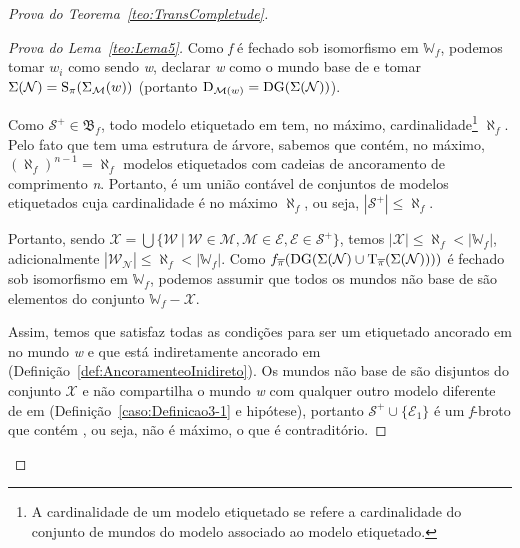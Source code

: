 \begin{apendicesenv}
\begin{proof}[Prova do Teorema~\ref{teo:TransCompletude}]
\begin{proof}[Prova do Lema~\ref{teo:Lema5}]
                Como \textit{f} é fechado sob isomorfismo em \(\mathbb{W}_f\), podemos tomar \(w_i\) como sendo \textit{w}, declarar \textit{w} como o mundo
                base de  e tomar \(\Sigma(\mathcal{N}) = \operatorname{S}_{\pi}(\Sigma_{\mathcal{M}}(w))\)
                (portanto \(\operatorname{D}_{\mathcal{M}(w)} = \operatorname{DG}(\Sigma(\mathcal{N}))\)).

                Como \(\mathcal{S}^{+} \in \mathfrak{B}_{f}\), todo modelo etiquetado em  tem, no máximo, cardinalidade\footnote{A cardinalidade de um modelo etiquetado
                se refere a cardinalidade do conjunto de mundos do modelo associado ao modelo etiquetado.} \(\aleph_{f}\).
                Pelo fato que  tem uma estrutura de árvore, sabemos que  contém, no máximo, \((\aleph_{f})^{n-1} = \aleph_{f}\)
                modelos etiquetados com cadeias de ancoramento de comprimento \textit{n}. Portanto,  é um união contável de conjuntos de modelos etiquetados cuja
                cardinalidade é no máximo \(\aleph_{f}\), ou seja, \(|\mathcal{S}^{+}| \leq \aleph_{f}\).

                Portanto, sendo \(\mathcal{X} = \bigcup \{\mathcal{W} \ | \ \mathcal{W} \in \mathcal{M}, \mathcal{M} \in \mathcal{E}, \mathcal{E} \in \mathcal{S}^{+} \}\), temos
                \(|\mathcal{X}| \leq \aleph_{f} < |\mathbb{W}_{f}|\), adicionalmente \(|\mathcal{W}_{\mathcal{N}}| \leq \aleph_{f} < |\mathbb{W}_{f}|\).
                Como \(f_{\overline{\pi}}(\operatorname{DG}(\Sigma(\mathcal{N}) \cup \operatorname{T}_{\overline{\pi}}(\Sigma(\mathcal{N}))))\) é fechado sob isomorfismo em \(\mathbb{W}_{f}\),
                podemos assumir que todos os mundos não base de  são elementos do conjunto \(\mathbb{W}_{f}-\mathcal{X}\).

                Assim, temos que  satisfaz todas as condições para ser um \OPImodelo etiquetado ancorado em  no mundo \textit{w}
                e que  está indiretamente ancorado em \Modeloinicial (Definição~\ref{def:AncoramenteoInidireto}).
                Os mundos não base de  são disjuntos do conjunto \(\mathcal{X}\) e  não compartilha o mundo \textit{w}
                com qualquer outro modelo diferente de  em  (Definição~\ref{caso:Definicao3-1} e hipótese), portanto
                \(\mathcal{S}^{+} \cup \{\mathcal{E}_{1}\}\) é um \textit{f}-broto que contém , ou seja,  não é máximo,
                o que é contraditório.
            \end{proof}


\end{proof}
\end{apendicesenv}
